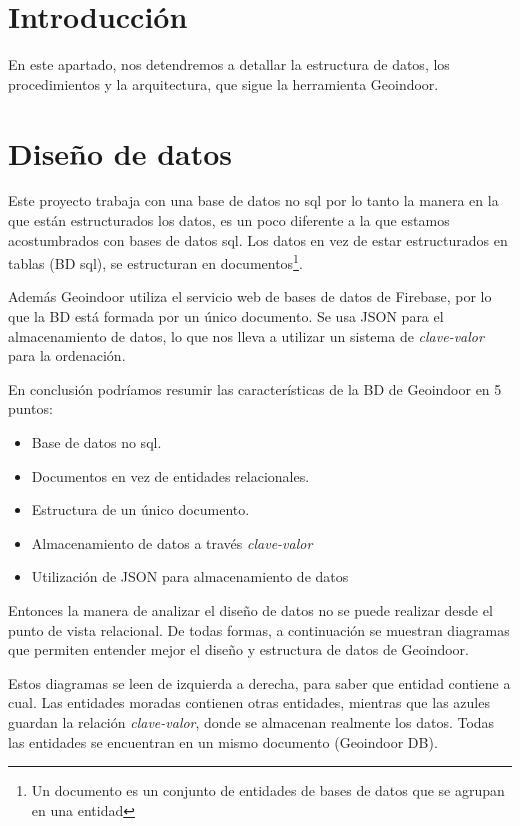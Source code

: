
\section{Introducción}
En este apartado, nos detendremos a detallar la estructura de datos, los procedimientos y la arquitectura, que sigue la herramienta Geoindoor.
\section{Diseño de datos}

Este proyecto trabaja con una base de datos no sql por lo tanto la manera en la que están estructurados los datos, es un poco diferente a la que estamos acostumbrados con bases de datos sql.
Los datos en vez de estar estructurados en tablas (BD sql), se estructuran en documentos\footnote{Un documento es un conjunto de entidades de bases de datos que se agrupan en una entidad}. 

Además Geoindoor utiliza el servicio web de bases de datos de Firebase, por lo que la BD está formada por un único documento. Se usa JSON para el almacenamiento de datos, lo que nos lleva a utilizar un sistema de \textit{clave-valor} para la ordenación.

En conclusión podríamos resumir las características de la BD de Geoindoor en 5 puntos:

\begin{itemize}
	\item Base de datos no sql.
	\item Documentos en vez de entidades relacionales.
	\item Estructura de un único documento.
	\item Almacenamiento de datos a través \textit{clave-valor}
	\item Utilización de JSON para almacenamiento de datos
\end{itemize} 

Entonces la manera de analizar el diseño de datos no se puede realizar desde el punto de vista relacional. De todas formas, a continuación se muestran diagramas que permiten entender mejor el diseño y estructura de datos de Geoindoor.


Estos diagramas se leen de izquierda a derecha, para saber que entidad contiene a cual. Las entidades moradas contienen otras entidades, mientras que las azules guardan la relación \textit{clave-valor}, donde se almacenan realmente los datos. Todas las entidades se encuentran en un mismo documento (Geoindoor DB).

